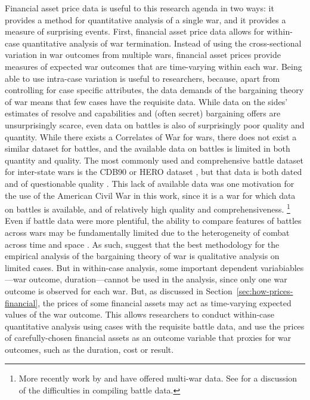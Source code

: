 Financial asset price data is useful to this research agenda in two ways: it provides a method for quantitative analysis of a single war, and it provides a measure of surprising events.
First, financial asset price data allows for within-case quantitative analysis of war termination.
Instead of using the cross-sectional variation in war outcomes from multiple wars, financial asset prices provide measures of expected war outcomes that are time-varying within each war.
Being able to use intra-case variation is useful to researchers, because, apart from controlling for case specific attributes, the data demands of the bargaining theory of war means that few cases have the requisite data.
While data on the sides' estimates of resolve and capabilities and (often secret) bargaining offers are unsurprisingly scarce, even data on battles is also of surprisingly poor quality and quantity.
While there exists a Correlates of War for wars, there does not exist a similar dataset for battles, and the available data on battles is limited in both quantity and quality.
The most commonly used and comprehensive battle dataset for inter-state wars is the CDB90 or HERO dataset \parencites{HistoricalResearchEtAl1984}{cdb90}, but that data is both dated and of questionable quality \parencites[32]{Reiter2003}{BiddleLong2004}.
This lack of available data was one motivation for the use of the American Civil War in this work, since it is a war for which data on battles is available, and of relatively high quality and comprehensiveness.%
\footnote{
More recently work by \textcite{Weisiger2015} and \textcite{CochranLong2014} have offered multi-war data.
See \textcites{cdb90}{Helmbold1995} for a discussion of the difficulties in compiling battle data.
}
Even if battle data were more plentiful, the ability to compare features of battles across wars may be fundamentally limited due to the heterogeneity of combat across time and space \parencite{Reiter2009}.
As such, \textcites{Reiter2003}{Reiter2009} suggest that the best methodology for the empirical analysis of the bargaining theory of war is qualitative analysis on limited cases.
But in within-case analysis, some important dependent variabiables---war outcome, \eg{}duration---cannot be used in the analysis, since only one war outcome is observed for each war.
But, as discussed in Section~\ref{sec:how-prices-financial}, the prices of some financial assets may act as time-varying expected values of the war outcome.
This allows researchers to conduct within-case quantitative analysis using cases with the requisite battle data, and use the prices of carefully-chosen financial assets as an outcome variable that proxies for war outcomes, such as the duration, cost or result.


